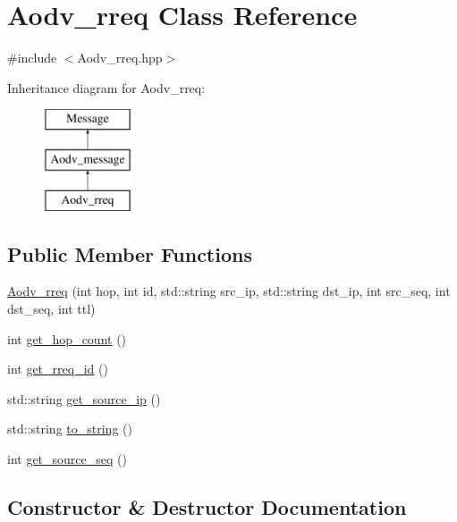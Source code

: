 \hypertarget{class_aodv__rreq}{}\section{Aodv\+\_\+rreq Class Reference}
\label{class_aodv__rreq}


{\ttfamily \#include $<$Aodv\+\_\+rreq.\+hpp$>$}

Inheritance diagram for Aodv\+\_\+rreq\+:\begin{figure}[H]
\begin{center}
\leavevmode
\includegraphics[height=3.000000cm]{class_aodv__rreq}
\end{center}
\end{figure}
\subsection*{Public Member Functions}
\begin{DoxyCompactItemize}
\item 
\hyperlink{class_aodv__rreq_a5deab97c844beb8a02f1d71df4fae9f3}{Aodv\+\_\+rreq} (int hop, int id, std\+::string src\+\_\+ip, std\+::string dst\+\_\+ip, int src\+\_\+seq, int dst\+\_\+seq, int ttl)
\item 
int \hyperlink{class_aodv__rreq_a7e9a7869c46962f9ff93dad0b2c1053d}{get\+\_\+hop\+\_\+count} ()
\item 
int \hyperlink{class_aodv__rreq_a0cf5bb3bcd3be60618f1786a63c446e5}{get\+\_\+rreq\+\_\+id} ()
\item 
std\+::string \hyperlink{class_aodv__rreq_a779f266d0ee485860f59d72f82685453}{get\+\_\+source\+\_\+ip} ()
\item 
std\+::string \hyperlink{class_aodv__rreq_ad743336a946da8d6a8eb300651973d5e}{to\+\_\+string} ()
\item 
int \hyperlink{class_aodv__rreq_a005ff0f29aea44171b1fedca685553c4}{get\+\_\+source\+\_\+seq} ()
\end{DoxyCompactItemize}


\subsection{Constructor \& Destructor Documentation}
